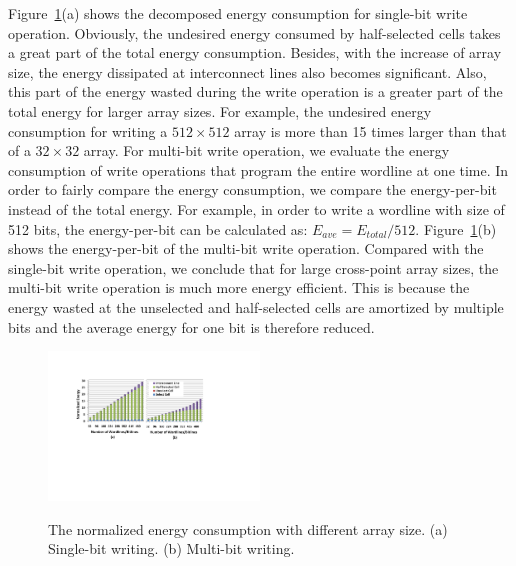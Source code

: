 Figure~\ref{fig:energy}(a) shows the decomposed energy consumption for
single-bit write operation. Obviously, the undesired energy consumed by
half-selected cells takes a great part of the total energy consumption.
Besides, with the increase of array size, the energy dissipated at
interconnect lines also becomes significant. Also, this part of the energy
wasted during the write operation is a greater part of the total energy
for larger array sizes. For example, the undesired energy consumption for
writing a $512{\times}512$ array is more than 15 times larger than that of
a $32{\times}32$ array. For multi-bit write operation, we evaluate the
energy consumption of write operations that program the entire wordline at
one time. In order to fairly compare the energy consumption, we compare
the energy-per-bit instead of the total energy. For example, in order to
write a wordline with size of 512 bits, the energy-per-bit can be
calculated as: $E_{ave}=E_{total}/512$. Figure~\ref{fig:energy}(b) shows
the energy-per-bit of the multi-bit write operation. Compared with the
single-bit write operation, we conclude that for large cross-point array
sizes, the multi-bit write operation is much more energy efficient. This
is because the energy wasted at the unselected and half-selected cells are
amortized by multiple bits and the average energy for one bit is therefore
reduced.

\begin{figure}%
\centering
  \includegraphics[width=0.5\textwidth]{./figures/energy_f_tall2.pdf}\\
  \caption{The normalized energy consumption with different array size. (a) Single-bit writing. (b) Multi-bit writing.}\label{fig:energy}
    \vspace{-10pt}
\end{figure}

